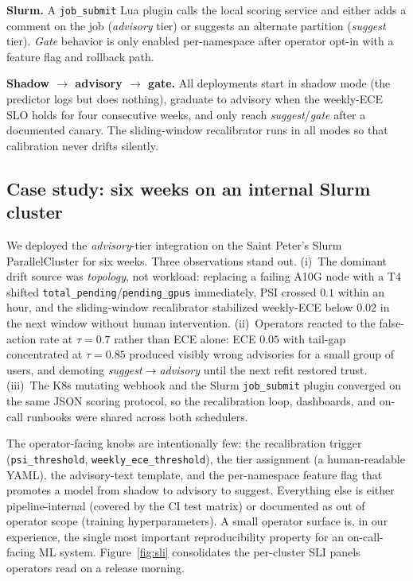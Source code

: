\documentclass[conference]{IEEEtran}
\begin{document}
\textbf{Slurm.} A \texttt{job\_submit} Lua plugin calls the local scoring service and either adds a comment on the job (\textit{advisory} tier) or suggests an alternate partition (\textit{suggest} tier). \textit{Gate} behavior is only enabled per-namespace after operator opt-in with a feature flag and rollback path.

\textbf{Shadow $\to$ advisory $\to$ gate.} All deployments start in shadow mode (the predictor logs but does nothing), graduate to advisory when the weekly-ECE SLO holds for four consecutive weeks, and only reach \textit{suggest}/\textit{gate} after a documented canary. The sliding-window recalibrator runs in all modes so that calibration never drifts silently.

\subsection{Case study: six weeks on an internal Slurm cluster}
We deployed the \textit{advisory}-tier integration on the Saint Peter's Slurm ParallelCluster for six weeks. Three observations stand out. (i)~The dominant drift source was \emph{topology}, not workload: replacing a failing A10G node with a T4 shifted \texttt{total\_pending}/\texttt{pending\_gpus} immediately, PSI crossed $0.1$ within an hour, and the sliding-window recalibrator stabilized weekly-ECE below $0.02$ in the next window without human intervention. (ii)~Operators reacted to the false-action rate at $\tau=0.7$ rather than ECE alone: ECE $0.05$ with tail-gap concentrated at $\tau=0.85$ produced visibly wrong advisories for a small group of users, and demoting \textit{suggest}$\to$\textit{advisory} until the next refit restored trust. (iii)~The K8s mutating webhook and the Slurm \texttt{job\_submit} plugin converged on the same JSON scoring protocol, so the recalibration loop, dashboards, and on-call runbooks were shared across both schedulers.

The operator-facing knobs are intentionally few: the recalibration trigger (\texttt{psi\_threshold}, \texttt{weekly\_ece\_threshold}), the tier assignment (a human-readable YAML), the advisory-text template, and the per-namespace feature flag that promotes a model from shadow to advisory to suggest. Everything else is either pipeline-internal (covered by the CI test matrix) or documented as out of operator scope (training hyperparameters). A small operator surface is, in our experience, the single most important reproducibility property for an on-call-facing ML system. Figure~\ref{fig:sli} consolidates the per-cluster SLI panels operators read on a release morning.
\end{document}
